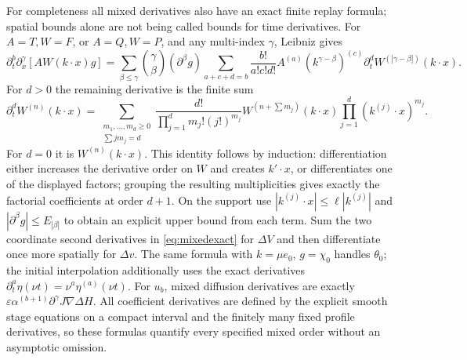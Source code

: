 For completeness all mixed derivatives also have an exact finite
replay formula; spatial bounds alone are not being called bounds for
time derivatives. For $A=T,W=F$, or $A=Q,W=P$, and any multi-index
$\gamma$, Leibniz gives
\begin{equation}
 \partial_t^b\partial_x^\gamma[AW(k\cdot x)g]
 =\sum_{\beta\leq\gamma}\binom\gamma\beta(\partial^\beta g)
 \sum_{a+c+d=b}\frac{b!}{a!c!d!}A^{(a)}
 (k^{\gamma-\beta})^{(c)}\partial_t^d
 W^{(|\gamma-\beta|)}(k\cdot x).
 \label{eq:mixedexact}
\end{equation}
For $d>0$ the remaining derivative is the finite sum
\[
 \partial_t^d W^{(n)}(k\cdot x)=
 \sum_{\substack{m_1,\ldots,m_d\geq0\\\sum j m_j=d}}
 \frac{d!}{\prod_{j=1}^d m_j!(j!)^{m_j}}
 W^{(n+\sum m_j)}(k\cdot x)
 \prod_{j=1}^d(k^{(j)}\cdot x)^{m_j}.
\]
For $d=0$ it is $W^{(n)}(k\cdot x)$. This identity follows by
induction: differentiation either increases the derivative order
on $W$ and creates $k'\cdot x$, or differentiates one of the
displayed factors; grouping the resulting multiplicities gives
exactly the factorial coefficients at order $d+1$.
On the support use $|k^{(j)}\cdot x|\leq\ell|k^{(j)}|$ and
$|\partial^\beta g|\leq E_{|\beta|}$ to obtain an explicit
upper bound from each term. Sum the two coordinate second
derivatives in \eqref{eq:mixedexact} for $\Delta V$ and then
differentiate once more spatially for $\Delta v$. The same formula
with $k=\mu e_0$, $g=\chi_0$ handles $\theta_0$; the initial
interpolation additionally uses the exact derivatives
$\partial_t^a\eta(\nu t)=\nu^a\eta^{(a)}(\nu t)$.
For $u_b$, mixed diffusion derivatives are exactly
$\varepsilon\alpha^{(b+1)}\partial^\gamma J\nabla\Delta H$.
All coefficient derivatives are defined by the explicit smooth
stage equations on a compact interval and the finitely many fixed
profile derivatives, so these formulas quantify every specified
mixed order without an asymptotic omission.

